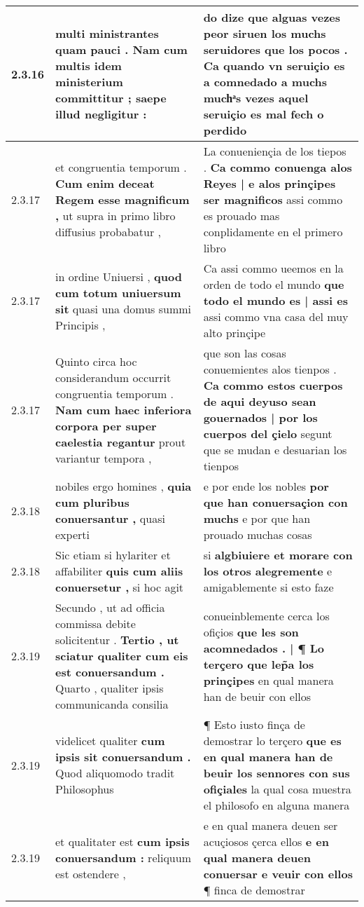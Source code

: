 \begin{tabular}{|p{1cm}|p{6.5cm}|p{6.5cm}|}
2.3.16 & multi ministrantes quam pauci . \textbf{ Nam cum multis idem ministerium committitur ; } saepe illud negligitur : & do dize que alguas vezes peor siruen los muchs seruidores que los pocos . \textbf{ Ca quando vn seruiçio es a comnedado a muchs } muchͣs vezes aquel seruiçio es mal fech o perdido \\\hline
2.3.17 & et congruentia temporum . \textbf{ Cum enim deceat Regem esse magnificum , } ut supra in primo libro diffusius probabatur , & La conueniençia de los tiepos . \textbf{ Ca commo conuenga alos Reyes | e alos prinçipes ser magnificos } assi commo es prouado mas conplidamente en el primero libro \\\hline
2.3.17 & in ordine Uniuersi , \textbf{ quod cum totum uniuersum sit } quasi una domus summi Principis , & Ca assi commo ueemos en la orden de todo el mundo \textbf{ que todo el mundo es | assi es } assi commo vna casa del muy alto prinçipe \\\hline
2.3.17 & Quinto circa hoc considerandum occurrit congruentia temporum . \textbf{ Nam cum haec inferiora corpora per super caelestia regantur } prout variantur tempora , & que son las cosas conuemientes alos tienpos . \textbf{ Ca commo estos cuerpos de aqui deyuso sean gouernados | por los cuerpos del çielo } segunt que se mudan e desuarian los tienpos \\\hline
2.3.18 & nobiles ergo homines , \textbf{ quia cum pluribus conuersantur , } quasi experti & e por ende los nobles \textbf{ por que han conuersaçion con muchs } e por que han prouado muchas cosas \\\hline
2.3.18 & Sic etiam si hylariter et affabiliter \textbf{ quis cum aliis conuersetur , } si hoc agit & si \textbf{ algbiuiere et morare con los otros alegremente } e amigablemente si esto faze \\\hline
2.3.19 & Secundo , ut ad officia commissa debite solicitentur . \textbf{ Tertio , ut sciatur qualiter cum eis est conuersandum . } Quarto , qualiter ipsis communicanda consilia & conueinblemente cerca los ofiçios \textbf{ que les son acomnedados . | ¶ Lo terçero que lep̃a los prinçipes } en qual manera han de beuir con ellos \\\hline
2.3.19 & videlicet qualiter \textbf{ cum ipsis sit conuersandum . } Quod aliquomodo tradit Philosophus & ¶ Esto iusto finça de demostrar lo terçero \textbf{ que es en qual manera han de beuir los sennores con sus ofiçiales } la qual cosa muestra el philosofo en alguna manera \\\hline
2.3.19 & et qualitater est \textbf{ cum ipsis conuersandum : } reliquum est ostendere , & e en qual manera deuen ser acuçiosos çerca ellos \textbf{ e en qual manera deuen conuersar e veuir con ellos } ¶ finca de demostrar \\\hline

\end{tabular}
